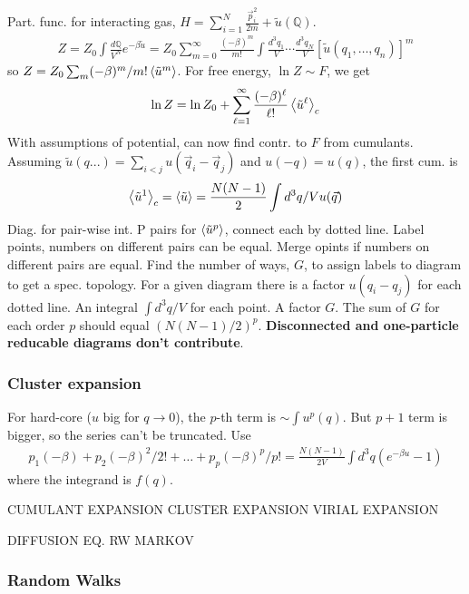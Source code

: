 \documentclass[a4paper, english, 12pt]{article}
\begin{document}
\begin{multicols*}{2}
Part. func. for interacting gas, $H=\sum_{i=1}^N \frac{\vec{p}_i^2}{2m}+\tilde{u}(\mathbb{Q})$. 
\begin{align*}
    Z = Z_0 \int \frac{d \mathbb{Q}}{V^N} e^{-\beta\tilde{u}} = Z_0 \sum_{m=0}^\infty \frac{(-\beta)^m}{m!} \int \frac{d^3 q_1}{V}\cdots \frac{d^3 q_N}{V}[\tilde{u}(q_1,\dots,q_n)]^m
\end{align*}
so $Z=Z_0 \sum_m (-\beta)^m/m! \expval{\tilde{u}^m}$. For free energy, $\ln Z\sim F$, we get 
\begin{align*}
    \ln Z = \ln Z_0 + \sum_{\ell=1}^\infty \frac{(-\beta)^\ell}{\ell!} \expval{\tilde{u}^\ell}_c
\end{align*}
With assumptions of potential, can now find contr. to $F$ from cumulants. Assuming $\tilde{u}(q...)=\sum_{i<j}u(\vec{q}_i-\vec{q}_j)$ and $u(-q)=u(q)$, the first cum. is 
\begin{align*}
    \expval{\tilde{u}^1}_c = \expval{\tilde{u}}=\frac{N(N-1)}{2}\int d^3 q/V u(\vec{q})
\end{align*}
Diag. for pair-wise int. P pairs for $\expval{\tilde{u}^p}$, connect each by dotted line. Label points, numbers on different pairs can be equal. Merge opints if numbers on different pairs are equal. Find the number of ways, $G$, to assign labels to diagram to get a spec. topology. For a given diagram there is a factor $u(q_i-q_j)$ for each dotted line. An integral $\int d^3 q/V$ for each point. A factor $G$. The sum of $G$ for each order $p$ should equal $(N(N-1)/2)^p$. \textbf{Disconnected and one-particle reducable diagrams don't contribute}. 

\subsubsection*{\scriptsize Cluster expansion}
For hard-core ($u$ big for $q\to0$), the $p$-th term is $\sim \int u^p(q)$. But $p+1$ term is bigger, so the series can't be truncated. Use 
\begin{align*}
    p_1 (-\beta)  + p_2 (-\beta)^2 /2! + \dots + p_p (-\beta)^p /p! = \frac{N(N-1)}{2V} \int d^3 q (e^{-\beta u}-1)
\end{align*}
where the integrand is $f(q)$.


CUMULANT EXPANSION 
CLUSTER EXPANSION 
VIRIAL EXPANSION 


DIFFUSION EQ. RW
MARKOV 


\subsubsection*{\scriptsize Random Walks}


\end{multicols*}
\end{document}
